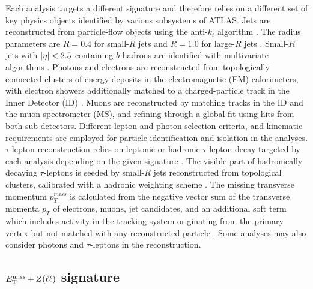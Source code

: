 Each analysis targets a different signature and therefore relies on a different set of key physics objects identified by various subsystems of ATLAS. Jets are reconstructed from particle-flow objects using the anti-$k_t$ algorithm \cite{Cacciari:2008gp,Fastjet, PERF-2015-09}. The radius parameters are $R=0.4$ for small-$R$ jets and $R=1.0$ for large-$R$ jets \cite{JETM-2018-05}. Small-$R$ jets with $\abs{\eta}<2.5$ containing $b$-hadrons are identified with multivariate algorithms \cite{FTAG-2019-07,FTAG-2018-01}. Photons and electrons are reconstructed from topologically connected clusters of energy deposits in the electromagnetic (EM) calorimeters, with electron showers additionally matched to a charged-particle track in the Inner Detector (ID) \cite{EGAM-2018-01,ATL-PHYS-PUB-2017-022}. Muons are reconstructed by matching tracks in the ID and the muon spectrometer (MS), and refining through a global fit using hits from both sub-detectors\cite{PERF-2015-10}. Different lepton and photon selection criteria, and kinematic requirements are employed for particle identification and isolation in the analyses. $\tau$-lepton reconstruction relies on leptonic or hadronic $\tau$-lepton decay targeted by each analysis depending on the given signature \cite{ATL-PHYS-PUB-2015-045,ATLAS-CONF-2017-029}. The visible part of hadronically decaying $\tau$-leptons is seeded by small-$R$ jets reconstructed from topological clusters, calibrated with a hadronic weighting scheme \cite{Barillari:1112035}. The missing transverse momentum $p_T^{miss}$ is calculated from the negative vector sum of the transverse momenta $p_T$ of electrons, muons, jet candidates, and an additional soft term which includes activity in the tracking system originating from the primary vertex but not matched with any reconstructed particle \cite{PERF-2016-07}. Some analyses may also consider photons and $\tau$-leptons in the \met reconstruction.

\subsection{\texorpdfstring{$E_{\mathrm{T}}^{\mathrm{miss}}+Z(\ell\ell)$}{TEXT} signature}

